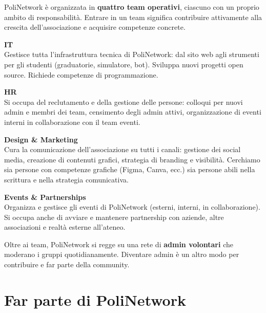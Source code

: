 \documentclass[letter]{core/polinetwork}
\begin{document}
PoliNetwork è organizzata in \textbf{quattro team operativi},
ciascuno con un proprio ambito di responsabilità. Entrare in un
team significa contribuire attivamente alla crescita
dell'associazione e acquisire competenze concrete.

\vspace{1em}

\noindent \textbf{\large\color{pn-primary} IT} \\
Gestisce tutta l'infrastruttura tecnica di PoliNetwork: dal
sito web agli strumenti per gli studenti (graduatorie, simulatore,
bot). Sviluppa nuovi progetti open source. Richiede competenze
di programmazione.

\vspace{0.8em}

\noindent \textbf{\large\color{pn-primary} HR} \\
Si occupa del reclutamento e della gestione delle persone:
colloqui per nuovi admin e membri dei team, censimento degli
admin attivi, organizzazione di eventi interni in collaborazione
con il team eventi.

\vspace{0.8em}

\noindent \textbf{\large\color{pn-primary} Design \& Marketing} \\
Cura la comunicazione dell'associazione su tutti i canali: gestione
dei social media, creazione di contenuti grafici, strategia di
branding e visibilità. Cerchiamo sia persone con competenze
grafiche (Figma, Canva, ecc.) sia persone abili nella scrittura
e nella strategia comunicativa.

\vspace{0.8em}

\noindent \textbf{\large\color{pn-primary} Events \& Partnerships} \\
Organizza e gestisce gli eventi di PoliNetwork (esterni, interni,
in collaborazione). Si occupa anche di avviare e mantenere
partnership con aziende, altre associazioni e realtà esterne
all'ateneo.

\vspace{1em}

Oltre ai team, PoliNetwork si regge su una rete di
\textbf{admin volontari} che moderano i gruppi quotidianamente.
Diventare admin è un altro modo per contribuire e far parte della
community.

\section{Far parte di PoliNetwork}
\end{document}
